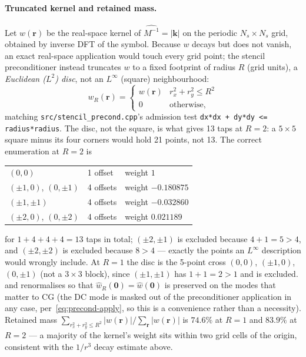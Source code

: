 \documentclass[11pt,a4paper]{article}
\newcommand{\bzero}{\mathbf{0}}
\begin{document}
\paragraph{Truncated kernel and retained mass.}
Let $w(\mathbf r)$ be the real-space kernel of $\widehat{M^{-1}} = |\mathbf
k|$ on the periodic $N_s\times N_s$ grid, obtained by inverse DFT of the
symbol. Because $w$ decays but does not vanish, an exact real-space
application would touch every grid point; the stencil preconditioner instead
truncates $w$ to a fixed footprint of radius $R$ (grid units), a
\emph{Euclidean ($L^2$) disc}, not an $L^\infty$ (square) neighbourhood:
\begin{equation}
  w_R(\mathbf r) = \begin{cases} w(\mathbf r) & r_x^2 + r_y^2 \le R^2 \\
                                   0 & \text{otherwise,} \end{cases}
  \label{eq:stencil-trunc}
\end{equation}
matching \texttt{src/stencil\_precond.cpp}'s admission test
\texttt{dx*dx + dy*dy <= radius*radius}. The disc, not the square, is what
gives 13 taps at $R=2$: a $5\times5$ square minus its four corners would hold
21 points, not 13. The correct enumeration at $R=2$ is
\begin{center}
\begin{tabular}{@{}lll@{}}
$(0,0)$ & 1 offset & weight $1$ \\
$(\pm1,0)$, $(0,\pm1)$ & 4 offsets & weight $-0.180875$ \\
$(\pm1,\pm1)$ & 4 offsets & weight $-0.032860$ \\
$(\pm2,0)$, $(0,\pm2)$ & 4 offsets & weight $0.021189$ \\
\end{tabular}
\end{center}
for $1 + 4 + 4 + 4 = 13$ taps in total; $(\pm2,\pm1)$ is excluded because
$4+1=5 > 4$, and $(\pm2,\pm2)$ is excluded because $8 > 4$ — exactly the
points an $L^\infty$ description would wrongly include. At $R=1$ the disc is
the 5-point cross $(0,0)$, $(\pm1,0)$, $(0,\pm1)$ (not a $3\times3$ block),
since $(\pm1,\pm1)$ has $1+1=2>1$ and is excluded.
and renormalises so that $\widehat w_R(\bzero) = \widehat w(\bzero)$ is
preserved on the modes that matter to CG (the DC mode is masked out of the
preconditioner application in any case, per~\eqref{eq:precond-apply}, so this
is a convenience rather than a necessity).
Retained mass $\sum_{r_x^2+r_y^2 \le R^2} |w(\mathbf r)| \big/
\sum_{\mathbf r} |w(\mathbf r)|$ is $74.6\%$ at $R=1$ and $83.9\%$ at $R=2$ —
a majority of the kernel's weight sits within two grid cells of the origin,
consistent with the $1/r^3$ decay estimate above.
\end{document}
